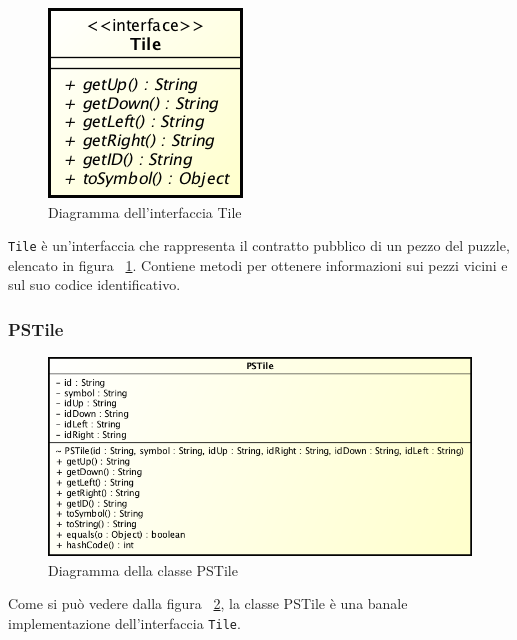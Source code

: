 \documentclass[a4paper, 12pt]{article}
\begin{document}
        \begin{figure}[H]

          \centering
          \includegraphics[scale=0.7]{uml/tile.png}
          \caption{Diagramma dell'interfaccia Tile}
          \label{uml:tile}

        \end{figure}

        \verb|Tile| è un'interfaccia che rappresenta il contratto pubblico di un pezzo del puzzle, elencato in figura ~\ref{uml:tile}. Contiene metodi per ottenere informazioni sui pezzi vicini e sul suo codice identificativo.

      \subsubsection{PSTile}

        \begin{figure}[H]

          \centering
          \includegraphics[scale=0.7]{uml/pstile.png}
          \caption{Diagramma della classe PSTile}
          \label{uml:pstile}

        \end{figure}

        Come si può vedere dalla figura ~\ref{uml:pstile}, la classe PSTile è una banale implementazione dell'interfaccia \verb|Tile|. 
\end{document}
